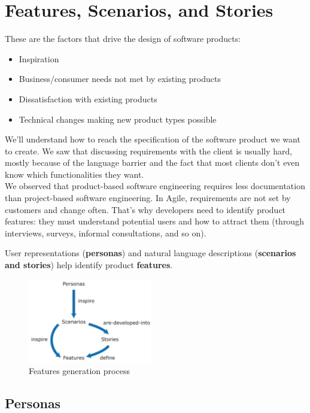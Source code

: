 \chapter{Features, Scenarios, and Stories}

These are the factors that drive the design of software products:
\begin{itemize}
    \item Inspiration
    \item Business/consumer needs not met by existing products
    \item Dissatisfaction with existing products
    \item Technical changes making new product types possible
\end{itemize}

We'll understand how to reach the specification of the software product we want to create. We saw that discussing requirements with the client is usually hard, mostly because of the language barrier and the fact that most clients don't even know which functionalities they want. \\

We observed that product-based software engineering requires less documentation than project-based software engineering. In Agile, requirements are not set by customers and change often. That's why developers need to identify product features: they must understand potential users and how to attract them (through interviews, surveys, informal consultations, and so on).

User representations (\textbf{personas}) and natural language descriptions (\textbf{scenarios and stories}) help identify product \textbf{features}. 

\begin{figure} [H]
    \centering
    \includegraphics[width=0.48\textwidth]{images/Stories/scenariostories.png}
    \caption{Features generation process}
    \label{fig:scenariostories}
\end{figure} 

\section{Personas}

